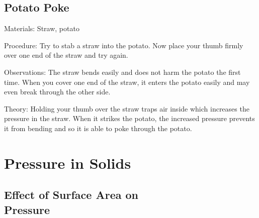 \begin{multicols}{2}
\subsection{Potato Poke}


\begin{description*}
\item[Materials:]{Straw, potato}
\item[Procedure:]{Try to stab a straw into the potato. Now place your thumb firmly over one end of the straw and try again.}
\item[Observations:]{The straw bends easily and does not harm the potato the first time. When you cover one end of the straw, it enters the potato easily and may even break through the other side.}
\item[Theory:]{Holding your thumb over the straw traps air inside which increases the pressure in the straw. When it strikes the potato, the increased pressure prevents it from bending and so it is able to poke through the potato.}
\end{description*}

\columnbreak


\section*{Pressure in Solids}


\subsection[Effect of Surface Area on Pressure]{Effect of Surface Area on \hfill \\ Pressure}


\end{multicols}
